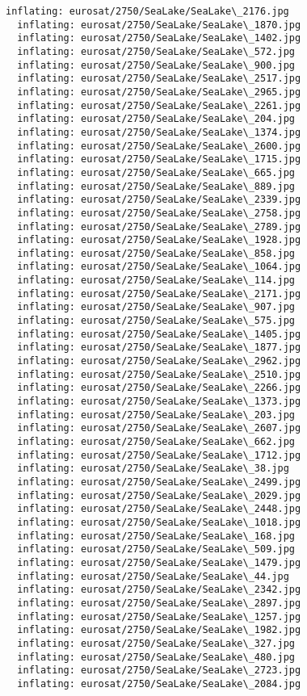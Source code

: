 \documentclass[11pt]{article}
\begin{document}
\begin{Verbatim}[commandchars=\\\{\}]
  inflating: eurosat/2750/SeaLake/SeaLake\_2176.jpg
  inflating: eurosat/2750/SeaLake/SeaLake\_1870.jpg
  inflating: eurosat/2750/SeaLake/SeaLake\_1402.jpg
  inflating: eurosat/2750/SeaLake/SeaLake\_572.jpg
  inflating: eurosat/2750/SeaLake/SeaLake\_900.jpg
  inflating: eurosat/2750/SeaLake/SeaLake\_2517.jpg
  inflating: eurosat/2750/SeaLake/SeaLake\_2965.jpg
  inflating: eurosat/2750/SeaLake/SeaLake\_2261.jpg
  inflating: eurosat/2750/SeaLake/SeaLake\_204.jpg
  inflating: eurosat/2750/SeaLake/SeaLake\_1374.jpg
  inflating: eurosat/2750/SeaLake/SeaLake\_2600.jpg
  inflating: eurosat/2750/SeaLake/SeaLake\_1715.jpg
  inflating: eurosat/2750/SeaLake/SeaLake\_665.jpg
  inflating: eurosat/2750/SeaLake/SeaLake\_889.jpg
  inflating: eurosat/2750/SeaLake/SeaLake\_2339.jpg
  inflating: eurosat/2750/SeaLake/SeaLake\_2758.jpg
  inflating: eurosat/2750/SeaLake/SeaLake\_2789.jpg
  inflating: eurosat/2750/SeaLake/SeaLake\_1928.jpg
  inflating: eurosat/2750/SeaLake/SeaLake\_858.jpg
  inflating: eurosat/2750/SeaLake/SeaLake\_1064.jpg
  inflating: eurosat/2750/SeaLake/SeaLake\_114.jpg
  inflating: eurosat/2750/SeaLake/SeaLake\_2171.jpg
  inflating: eurosat/2750/SeaLake/SeaLake\_907.jpg
  inflating: eurosat/2750/SeaLake/SeaLake\_575.jpg
  inflating: eurosat/2750/SeaLake/SeaLake\_1405.jpg
  inflating: eurosat/2750/SeaLake/SeaLake\_1877.jpg
  inflating: eurosat/2750/SeaLake/SeaLake\_2962.jpg
  inflating: eurosat/2750/SeaLake/SeaLake\_2510.jpg
  inflating: eurosat/2750/SeaLake/SeaLake\_2266.jpg
  inflating: eurosat/2750/SeaLake/SeaLake\_1373.jpg
  inflating: eurosat/2750/SeaLake/SeaLake\_203.jpg
  inflating: eurosat/2750/SeaLake/SeaLake\_2607.jpg
  inflating: eurosat/2750/SeaLake/SeaLake\_662.jpg
  inflating: eurosat/2750/SeaLake/SeaLake\_1712.jpg
  inflating: eurosat/2750/SeaLake/SeaLake\_38.jpg
  inflating: eurosat/2750/SeaLake/SeaLake\_2499.jpg
  inflating: eurosat/2750/SeaLake/SeaLake\_2029.jpg
  inflating: eurosat/2750/SeaLake/SeaLake\_2448.jpg
  inflating: eurosat/2750/SeaLake/SeaLake\_1018.jpg
  inflating: eurosat/2750/SeaLake/SeaLake\_168.jpg
  inflating: eurosat/2750/SeaLake/SeaLake\_509.jpg
  inflating: eurosat/2750/SeaLake/SeaLake\_1479.jpg
  inflating: eurosat/2750/SeaLake/SeaLake\_44.jpg
  inflating: eurosat/2750/SeaLake/SeaLake\_2342.jpg
  inflating: eurosat/2750/SeaLake/SeaLake\_2897.jpg
  inflating: eurosat/2750/SeaLake/SeaLake\_1257.jpg
  inflating: eurosat/2750/SeaLake/SeaLake\_1982.jpg
  inflating: eurosat/2750/SeaLake/SeaLake\_327.jpg
  inflating: eurosat/2750/SeaLake/SeaLake\_480.jpg
  inflating: eurosat/2750/SeaLake/SeaLake\_2723.jpg
  inflating: eurosat/2750/SeaLake/SeaLake\_2084.jpg

\end{Verbatim}
\end{document}
